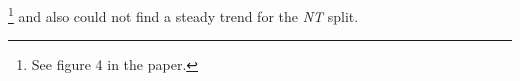 \citet{aug_zhang2019aspectbased}\footnote{See figure 4 in the paper.} and also could not find a steady trend for the \textit{NT} split.


